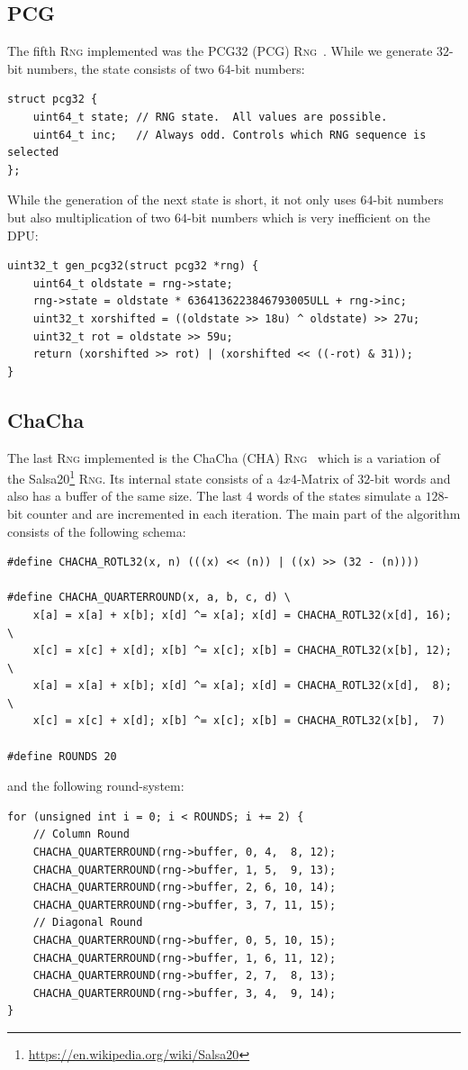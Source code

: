 \documentclass[a4paper]{scrartcl}
\begin{document}
\subsection{PCG} \label{sec:2.5}
The fifth \textsc{Rng} implemented was the PCG32 (PCG) \textsc{Rng}~\cite*{PCG}.
While we generate $32$-bit numbers, the state consists of two $64$-bit numbers:
\begin{lstlisting}[style=CStyle]
struct pcg32 {      
    uint64_t state; // RNG state.  All values are possible.
    uint64_t inc;   // Always odd. Controls which RNG sequence is selected
};
\end{lstlisting}
While the generation of the next state is short, it not only uses $64$-bit numbers but also multiplication of two $64$-bit numbers which is very inefficient on the DPU:
\begin{lstlisting}[style=CStyle]
uint32_t gen_pcg32(struct pcg32 *rng) {
    uint64_t oldstate = rng->state;
    rng->state = oldstate * 6364136223846793005ULL + rng->inc;
    uint32_t xorshifted = ((oldstate >> 18u) ^ oldstate) >> 27u;
    uint32_t rot = oldstate >> 59u;
    return (xorshifted >> rot) | (xorshifted << ((-rot) & 31));
} 
\end{lstlisting}

\subsection{ChaCha} \label{sec:2.6}
The last \textsc{Rng} implemented is the ChaCha (CHA) \textsc{Rng}~\cite*{CHA} which is a variation of the Salsa20\footnote{\url{https://en.wikipedia.org/wiki/Salsa20}} \textsc{Rng}.
Its internal state consists of a $4x4$-Matrix of $32$-bit words and also has a buffer of the same size.
The last $4$ words of the states simulate a $128$-bit counter and are incremented in each iteration.
The main part of the algorithm consists of the following schema:
\begin{lstlisting}[style=CStyle]
#define CHACHA_ROTL32(x, n) (((x) << (n)) | ((x) >> (32 - (n))))

#define CHACHA_QUARTERROUND(x, a, b, c, d) \
    x[a] = x[a] + x[b]; x[d] ^= x[a]; x[d] = CHACHA_ROTL32(x[d], 16); \
    x[c] = x[c] + x[d]; x[b] ^= x[c]; x[b] = CHACHA_ROTL32(x[b], 12); \
    x[a] = x[a] + x[b]; x[d] ^= x[a]; x[d] = CHACHA_ROTL32(x[d],  8); \
    x[c] = x[c] + x[d]; x[b] ^= x[c]; x[b] = CHACHA_ROTL32(x[b],  7)

#define ROUNDS 20
\end{lstlisting}
\newpage
\noindent and the following round-system:
\begin{lstlisting}[style=CStyle]
for (unsigned int i = 0; i < ROUNDS; i += 2) {
    // Column Round
    CHACHA_QUARTERROUND(rng->buffer, 0, 4,  8, 12);
    CHACHA_QUARTERROUND(rng->buffer, 1, 5,  9, 13);
    CHACHA_QUARTERROUND(rng->buffer, 2, 6, 10, 14);
    CHACHA_QUARTERROUND(rng->buffer, 3, 7, 11, 15);
    // Diagonal Round
    CHACHA_QUARTERROUND(rng->buffer, 0, 5, 10, 15);
    CHACHA_QUARTERROUND(rng->buffer, 1, 6, 11, 12);
    CHACHA_QUARTERROUND(rng->buffer, 2, 7,  8, 13);
    CHACHA_QUARTERROUND(rng->buffer, 3, 4,  9, 14);
}
\end{lstlisting}
\end{document}
